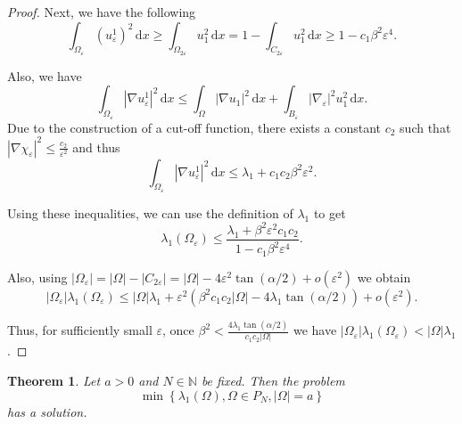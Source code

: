 \documentclass[12pt]{report}
\newtheorem{theorem}{Theorem}[section]
\numberwithin{definition}{section}
\begin{document}
\begin{proof}
  Next, we have the following
  \[
  \int_{ \Omega_{\varepsilon}} \! (u_{\varepsilon}^{1})^{2} \, \mathrm{d}x \geq \int_{ \Omega_{2 \varepsilon}} \! u_{1}^{2} \, \mathrm{d}x = 1 - \int_{ C_{2 \varepsilon}} \! u_{1}^{2} \, \mathrm{d}x \geq 1 - c_{1}\beta^{2}\varepsilon^{4}
  .\] 

  Also, we have
  \[
  \int_{ \Omega_{\varepsilon}} \! | \nabla u_{\varepsilon}^{1} |^{2} \, \mathrm{d}x \leq \int_{ \Omega} \! | \nabla u_{1} |^{2} \, \mathrm{d}x  + \int_{ B_{\varepsilon}} \! | \nabla_{\varepsilon} |^{2} u_{1}^{2} \, \mathrm{d}x 
  .\] 
  Due to the construction of a cut-off function, there exists a constant $c_{2}$ such that $| \nabla \chi_{\varepsilon} |^{2} \leq \frac{c_{2}}{\varepsilon^{2}}$ and thus
  \[
  \int_{ \Omega_{\varepsilon}} \! | \nabla u_{\varepsilon}^{1} |^{2} \, \mathrm{d}x \leq  \lambda_{1} + c_{1}c_{2} \beta^{2} \varepsilon^{2}
  .\] 

  Using these inequalities, we can use the definition of $\lambda_{1}$ to get
  \[
  \lambda_{1}(\Omega_{\varepsilon}) \leq \frac{\lambda_{1} + \beta^{2}\varepsilon^{2}c_{1}c_{2}}{1 - c_{1}\beta^{2}\varepsilon^{4}}
  .\] 

  Also, using $| \Omega_{\varepsilon} | = | \Omega | - | C_{2 \varepsilon} | = | \Omega | - 4 \varepsilon^{2} \tan (\alpha / 2) + o(\varepsilon^{2})$ we obtain
  \[
  | \Omega_{\varepsilon} |\lambda_{1}(\Omega_{\varepsilon}) \leq | \Omega |\lambda_{1} + \varepsilon^{2} \left( \beta^{2} c_{1}c_{2}| \Omega | - 4 \lambda_{1}\tan (\alpha / 2) \right ) + o(\varepsilon^{2})
  .\] 

  Thus, for sufficiently small $\varepsilon$, once $\beta^{2} < \frac{4 \lambda_{1}\tan(\alpha / 2)}{c_{1}c_{2}| \Omega |}$ we have $| \Omega_{\varepsilon}|\lambda_{1}(\Omega_{\varepsilon}) < | \Omega |\lambda_{1}$.
\end{proof}


\begin{theorem}
  Let $a > 0$ and $N \in \mathbb{N}$ be fixed.
  Then the problem
  \[
    \min \left\{ \lambda_{1}(\Omega), \Omega \in P_{N}, |\Omega| = a \right\} 
  \] 
  has a solution.
\end{theorem}
\end{document}
